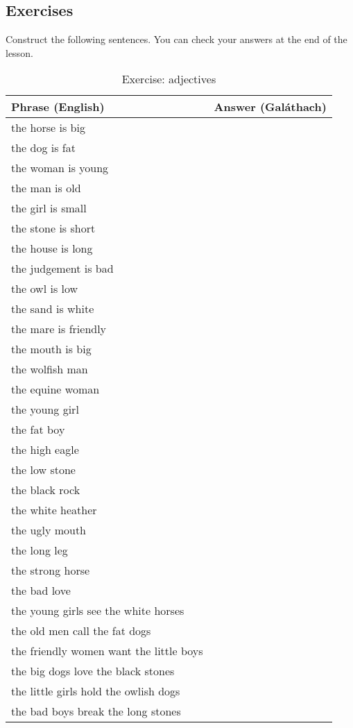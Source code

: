 \newpage
\subsection{Exercises}

Construct the following sentences. You can check your answers at the end of the lesson.
\begin{table}[H]
\centering
\begin{tabu}{|l|M{10.0cm}|}
  \toprule
  \textbf{Phrase (English)} & \textbf{Answer (Gal\'{a}thach)}\\
  \toprule
  the horse is big & \\
  \midrule
  the dog is fat & \\
  \midrule
  the woman is young & \\
  \midrule
  the man is old & \\
  \midrule
  the girl is small & \\
  \midrule
  the stone is short & \\
  \midrule
  the house is long & \\
  \midrule
  the judgement is bad & \\
  \midrule
  the owl is low & \\
  \midrule
  the sand is white & \\
  \midrule
  the mare is friendly & \\
  \midrule
  the mouth is big & \\
  \midrule
  the wolfish man & \\
  \midrule
  the equine woman & \\
  \midrule
  the young girl & \\
  \midrule
  the fat boy & \\
  \midrule
  the high eagle & \\
  \midrule
  the low stone & \\
  \midrule
  the black rock & \\
  \midrule
  the white heather & \\
  \midrule
  the ugly mouth & \\
  \midrule
  the long leg & \\
  \midrule
  the strong horse & \\
  \midrule
  the bad love & \\
  \midrule
  the young girls see the white horses & \\
  \midrule
  the old men call the fat dogs & \\
  \midrule
  the friendly women want the little boys & \\
  \midrule
  the big dogs love the black stones & \\
  \midrule
  the little girls hold the owlish dogs & \\
  \midrule
  the bad boys break the long stones & \\
  \bottomrule
\end{tabu}
\label{exercise_adjectives}
\caption{Exercise: adjectives}
\end{table}


